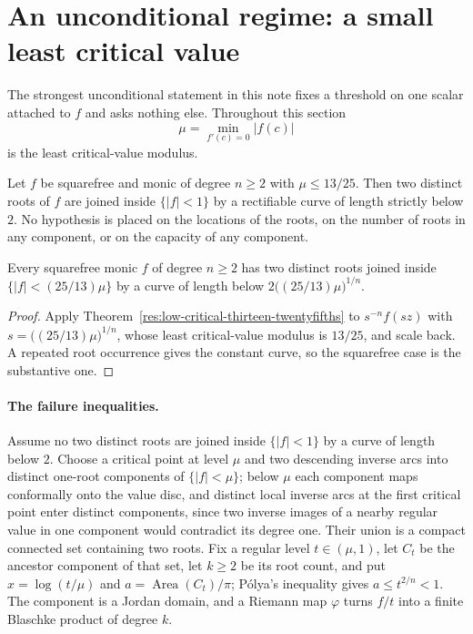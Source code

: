 \documentclass[11pt]{article}
\begin{document}
\section{An unconditional regime: a small least critical value}
\label{sec:low-critical-closure}

The strongest unconditional statement in this note fixes a threshold on one
scalar attached to $f$ and asks nothing else.  Throughout this section
\[
 \mu=\min_{f'(c)=0}|f(c)|
\]
is the least critical-value modulus.

\begin{theorem}
\label{res:low-critical-thirteen-twentyfifths}
Let $f$ be squarefree and monic of degree $n\ge2$ with $\mu\le13/25$.  Then
two distinct roots of $f$ are joined inside $\{|f|<1\}$ by a rectifiable
curve of length strictly below $2$.  No hypothesis is placed on the locations
of the roots, on the number of roots in any component, or on the capacity of
any component.
\end{theorem}

\begin{corollary}
\label{res:low-critical-scale-free}
Every squarefree monic $f$ of degree $n\ge2$ has two distinct roots joined
inside $\{|f|<(25/13)\mu\}$ by a curve of length below
$2\bigl((25/13)\mu\bigr)^{1/n}$.
\end{corollary}

\begin{proof}
Apply Theorem~\ref{res:low-critical-thirteen-twentyfifths} to
$s^{-n}f(sz)$ with $s=\bigl((25/13)\mu\bigr)^{1/n}$, whose least
critical-value modulus is $13/25$, and scale back.  A repeated root occurrence
gives the constant curve, so the squarefree case is the substantive one.
\end{proof}

\paragraph{The failure inequalities.}
Assume no two distinct roots are joined inside $\{|f|<1\}$ by a curve of
length below $2$.  Choose a critical point at level $\mu$ and two descending
inverse arcs into distinct one-root components of $\{|f|<\mu\}$; below $\mu$
each component maps conformally onto the value disc, and distinct local
inverse arcs at the first critical point enter distinct components, since two
inverse images of a nearby regular value in one component would contradict its
degree one.  Their union is a compact connected set containing two roots.
Fix a regular level $t\in(\mu,1)$, let $C_t$ be the ancestor component of that
set, let $k\ge2$ be its root count, and put $x=\log(t/\mu)$ and
$a=\operatorname{Area}(C_t)/\pi$; P\'olya's inequality gives $a\le t^{2/n}<1$.
The component is a Jordan domain, and a Riemann map $\varphi$ turns $f/t$ into
a finite Blaschke product of degree $k$.
\end{document}
